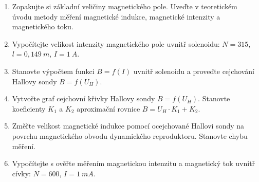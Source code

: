 \begin{minipage}[H][11.48cm][c]{0.8\textwidth}
  \begin{enumerate}
    \item
      Zopakujte si základní veličiny magnetického pole. Uveďte v teoretickém úvodu metody měření magnetické indukce, magnetické intenzity a magnetického toku.
    \item
      Vypočítejte velikost intenzity magnetického pole uvnitř solenoidu:\newline
      $N = 315$, $l=0,149~m$, $I=1~A$.
    \item
			Stanovte výpočtem funkci $B=f(I)$ uvnitř solenoidu a proveďte cejchování Hallovy sondy $B=f(U_H)$.
		\item
			Vytvořte graf cejchovní křivky Hallovy sondy $B=f(U_H)$. Stanovte koeficienty $K_1$ a $K_2$ aproximační rovnice $B = U_H \cdot K_1 + K_2$.
    \item
      Změřte velikost magnetické indukce pomocí ocejchované Hallovi sondy na povrchu magnetického obvodu dynamického reproduktoru. Stanovte chybu měření.
    \item
      Vypočítejte s ověřte měřením magnetickou intenzitu a magnetický tok uvnitř cívky:\newline
      $N = 600$, $I = 1~mA$.
	\end{enumerate}
\end{minipage}



